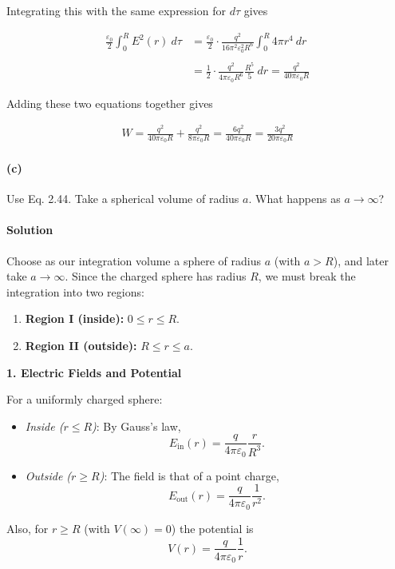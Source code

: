 \documentclass{article}
\begin{document}
\newpage

Integrating this with the same expression for $d\tau$ gives 

\begin{align*}
    \frac{\varepsilon_0}{2}\int_0^R E^2(r)\ d\tau &= \frac{\varepsilon_0}{2}\cdot \frac{q^2}{16\pi^2 \varepsilon^2_0R^6}\int_0^R 4\pi r^4\ dr \\
    \\
    &= \frac{1}{2}\cdot \frac{q^2}{4\pi \varepsilon_0R^6}\frac{R^5}{5}\ dr = \frac{q^2}{40\pi \varepsilon_0 R}
\end{align*}

Adding these two equations together gives 

\begin{align*}
    W = \frac{q^2}{40\pi \varepsilon_0 R} + \frac{q^2}{8\pi\varepsilon_0 R} = \frac{6q^2}{40\pi\varepsilon_0 R} = \frac{3q^2}{20\pi\varepsilon_0 R}
\end{align*}

\paragraph{(c)} Use Eq. 2.44. Take a spherical volume of radius $a$. What happens as $a \rightarrow \infty$?

\paragraph{Solution} Choose as our integration volume a sphere of radius \( a \) (with \( a>R \)), and later take \( a\to\infty \). Since the charged sphere has radius \( R \), we must break the integration into two regions:
\begin{enumerate}
  \item \textbf{Region I (inside):} \( 0\le r\le R \).
  \item \textbf{Region II (outside):} \( R\le r\le a \).
\end{enumerate}

\textbf{1. Electric Fields and Potential}

For a uniformly charged sphere:
\begin{itemize}
  \item \emph{Inside (\( r\le R \))}: By Gauss’s law,
    \[
    E_{\mathrm{in}}(r)=\frac{q}{4\pi\varepsilon_0}\frac{r}{R^3}.
    \]
  \item \emph{Outside (\( r\ge R \))}: The field is that of a point charge,
    \[
    E_{\mathrm{out}}(r)=\frac{q}{4\pi\varepsilon_0}\frac{1}{r^2}.
    \]
\end{itemize}
Also, for \( r\ge R \) (with \( V(\infty)=0 \)) the potential is
\[
V(r)=\frac{q}{4\pi\varepsilon_0}\frac{1}{r}.
\]
\end{document}
